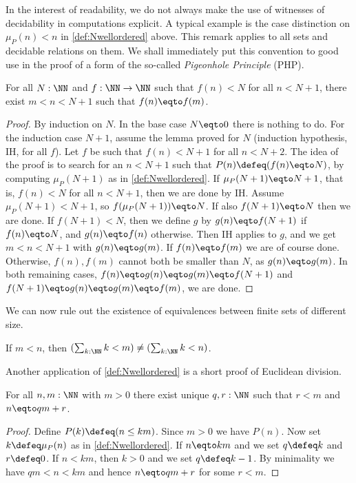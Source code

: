 \begin{remark}\label{rem:computations-can-decide}
In the interest of readability, we do not always make the use
of witnesses of decidability in computations explicit.
A typical example is the case distinction on $\mu_P(n) < n$ in
\cref{def:Nwellordered} above. This remark applies to all
sets and decidable relations on them. We shall immediately put
this convention to good use in the proof of a form of the so-called
\emph{Pigeonhole Principle} (PHP).
\end{remark}

\begin{lemma}\label{lem:PHP}
For all $N:\NN$ and $f:\NN\to\NN$ such that $f(n)<N$
for all $n<N+1$, there exist $m < n < N+1$ such that $f(n) \eqto f(m)$.
\end{lemma}
\begin{proof}
By induction on $N$. In the base case $N \eqto 0$ there is nothing to do.
For the induction case $N+1$, assume the lemma proved for $N$
(induction hypothesis, IH, for all $f$). Let $f$ be such
that $f(n)<N+1$ for all $n<N+2$. The idea of the proof is
to search for an $n<N+1$ such that $P(n)\defeq (f(n) \eqto N)$,
by computing $\mu_P(N+1)$ as in \cref{def:Nwellordered}.
If $\mu_P(N+1) \eqto N+1$, that is, $f(n)<N$ for all $n<N+1$,
then we are done by IH. Assume $\mu_P(N+1) < N+1$,
so $f(\mu_P(N+1)) \eqto N$.
If also $f(N+1) \eqto N$ then we are done.
If $f(N+1)<N$, then we define $g$ by $g(n) \eqto f(N+1)$
if $f(n) \eqto N$, and $g(n) \eqto f(n)$ otherwise.
Then IH applies to $g$, and we get $m < n < N+1$ with
$g(n) \eqto g(m)$. If $f(n) \eqto f(m)$ we are of course done.
Otherwise, $f(n),f(m)$ cannot both be smaller than $N$,
as $g(n) \eqto g(m)$. In both remaining cases,
$f(n) \eqto g(n) \eqto g(m) \eqto f(N+1)$ and $f(N+1) \eqto g(n) \eqto g(m) \eqto f(m)$,
we are done.
\end{proof}

We can now rule out the existence of equivalences between finite
sets of different size.
\begin{corollary}\label{cor:Fin-n-injective}
If $m<n$, then $(\sum_{k:\NN} k<m) \neq (\sum_{k:\NN} k<n)$.
\end{corollary}

Another application of \cref{def:Nwellordered} is a
short proof of Euclidean division.
\begin{lemma}\label{lem:euclid-div}
  For all $n,m:\NN$ with $m>0$ there exist unique $q,r:\NN$
  such that $r<m$ and $n \eqto qm+r$.
\end{lemma}
\begin{proof}
Define $P(k)\defeq (n\leq km)$. Since $m>0$ we have $P(n)$.
Now set $k\defeq\mu_P(n)$ as in \cref{def:Nwellordered}.
If $n \eqto km$ and we set $q\defeq k$ and $r\defeq 0$.
If $n<km$, then $k>0$ and we set $q\defeq k-1$.
By minimality we have $qm<n<km$ and hence $n \eqto qm+r$ for some $r<m$.
\end{proof}

